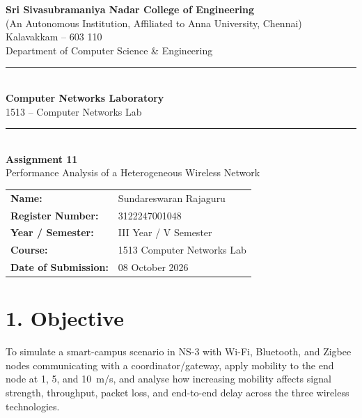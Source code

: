 \documentclass[11pt]{article}
\title{\vspace{-2cm}}
\date{}
\begin{document}
\begin{titlepage}
\centering
\vspace*{1cm}
{\large \textbf{Sri Sivasubramaniya Nadar College of Engineering}}\\
{\small (An Autonomous Institution, Affiliated to Anna University, Chennai)}\\
{\small Kalavakkam -- 603 110}\\[0.3cm]
{\small Department of Computer Science \& Engineering}\\[1.5cm]

\rule{\linewidth}{0.5mm}\\[0.4cm]
{\LARGE \textbf{Computer Networks Laboratory}}\\[0.3cm]
{\Large 1513 -- Computer Networks Lab}\\[0.4cm]
\rule{\linewidth}{0.5mm}\\[1.5cm]

{\huge \textbf{Assignment 11}}\\[0.4cm]
{\Large Performance Analysis of a Heterogeneous Wireless Network}\\[2cm]

\begin{center}
\begin{tabular}{ll}
\textbf{Name:} & Sundareswaran Rajaguru \\[0.2cm]
\textbf{Register Number:} & 3122247001048 \\[0.2cm]
\textbf{Year / Semester:} & III Year / V Semester \\[0.2cm]
\textbf{Course:} & 1513 Computer Networks Lab \\[0.2cm]
\textbf{Date of Submission:} & 08 October 2026 \\[0.2cm]
\end{tabular}
\end{center}

\vfill
\end{titlepage}

\section*{1. Objective}
To simulate a smart-campus scenario in NS-3 with Wi-Fi, Bluetooth, and
Zigbee nodes communicating with a coordinator/gateway, apply mobility to the
end node at 1, 5, and 10~m/s, and analyse how increasing mobility affects
signal strength, throughput, packet loss, and end-to-end delay across the
three wireless technologies.
\end{document}
